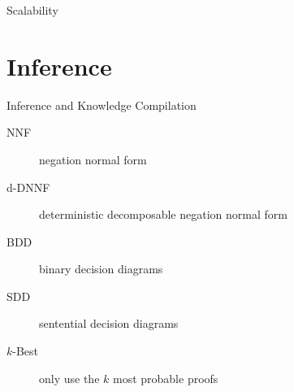 \documentclass{beamer}
\begin{document}
\begin{frame}{Scalability}
  \centering
  
\end{frame}

\section{Inference}

\begin{frame}{Inference and Knowledge Compilation}
  \begin{description}
  \item[NNF] negation normal form
  \item[d-DNNF] deterministic decomposable negation normal form
  \item[BDD] binary decision diagrams
  \item[SDD] sentential decision diagrams
  \item[$k$-Best] only use the \alert{$k$} most probable proofs
  \end{description}
\end{frame}
\end{document}
